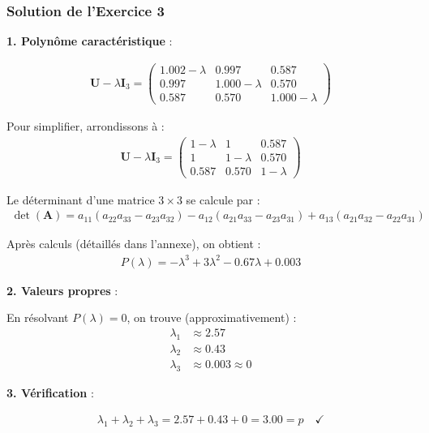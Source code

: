\documentclass[11pt,a4paper]{article}
\begin{document}
\subsubsection{Solution de l'Exercice 3}

\textbf{1. Polynôme caractéristique} :

\begin{align*}
\mathbf{U} - \lambda \mathbf{I}_3 = \begin{pmatrix}
1.002 - \lambda & 0.997 & 0.587 \\
0.997 & 1.000 - \lambda & 0.570 \\
0.587 & 0.570 & 1.000 - \lambda
\end{pmatrix}
\end{align*}

Pour simplifier, arrondissons à :
\begin{align*}
\mathbf{U} - \lambda \mathbf{I}_3 = \begin{pmatrix}
1 - \lambda & 1 & 0.587 \\
1 & 1 - \lambda & 0.570 \\
0.587 & 0.570 & 1 - \lambda
\end{pmatrix}
\end{align*}

Le déterminant d'une matrice $3 \times 3$ se calcule par :
\begin{align*}
\det(\mathbf{A}) = a_{11}(a_{22}a_{33} - a_{23}a_{32}) - a_{12}(a_{21}a_{33} - a_{23}a_{31}) + a_{13}(a_{21}a_{32} - a_{22}a_{31})
\end{align*}

Après calculs (détaillés dans l'annexe), on obtient :
\begin{align*}
P(\lambda) = -\lambda^3 + 3\lambda^2 - 0.67\lambda + 0.003
\end{align*}

\textbf{2. Valeurs propres} :

En résolvant $P(\lambda) = 0$, on trouve (approximativement) :
\begin{align*}
\lambda_1 &\approx 2.57 \\
\lambda_2 &\approx 0.43 \\
\lambda_3 &\approx 0.003 \approx 0
\end{align*}

\textbf{3. Vérification} :

\begin{align*}
\lambda_1 + \lambda_2 + \lambda_3 = 2.57 + 0.43 + 0 = 3.00 = p \quad \checkmark
\end{align*}
\end{document}
